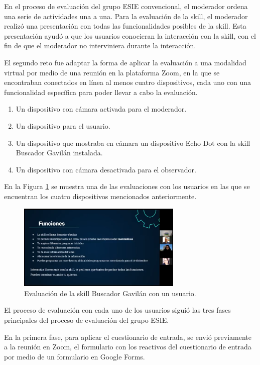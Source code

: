En el proceso de evaluación del grupo ESIE convencional, el moderador ordena una serie de actividades una a una. Para la evaluación de la skill, el moderador realizó una presentación con todas las funcionalidades posibles de la skill. Esta presentación ayudó a que los usuarios conocieran la interacción con la skill, con el fin de que el moderador no interviniera durante la interacción.

El segundo reto fue adaptar la forma de aplicar la evaluación a una modalidad virtual por medio de una reunión en la plataforma Zoom, en la que se encontraban conectados en línea al menos cuatro dispositivos, cada uno con una funcionalidad específica para poder llevar a cabo la evaluación.

\begin{enumerate}
  \item Un dispositivo con cámara activada para el moderador.
  \item Un dispositivo para el usuario.
  \item Un dispositivo que mostraba en cámara un dispositivo Echo Dot con la skill Buscador Gavilán instalada.
  \item Un dispositivo con cámara desactivada para el observador.
\end{enumerate}

En la Figura \ref{fig:424} se muestra una de las evaluaciones con los usuarios en las que se encuentran los cuatro dispositivos mencionados anteriormente.

\begin{figure}[H]
  \centering
  \includegraphics[width=0.70\textwidth]{Cap4/Figuras/Pruebas usuario 1.png}
  \caption{Evaluación de la skill Buscador Gavilán con un usuario.}
  \label{fig:424}
\end{figure}

El proceso de evaluación con cada uno de los usuarios siguió las tres fases principales del proceso de evaluación del grupo ESIE.

En la primera fase, para aplicar el cuestionario de entrada, se envió previamente a la reunión en Zoom, el formulario con los reactivos del cuestionario de entrada por medio de un formulario en Google Forms.

